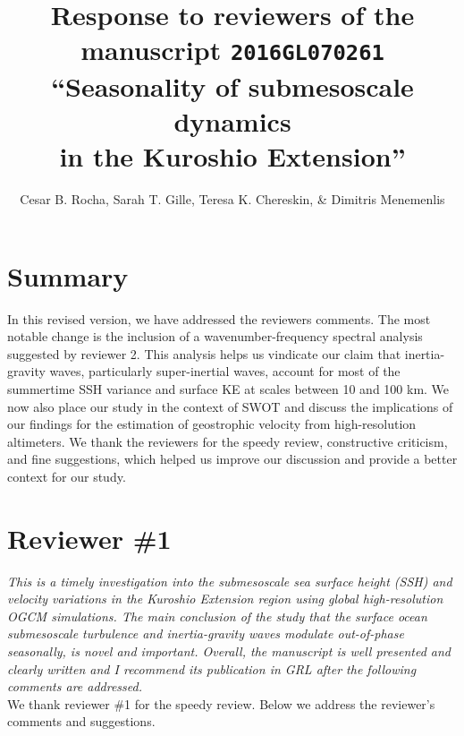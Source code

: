 \documentclass[11pt]{article}
\title{{\normalfont Response to reviewers of the manuscript \texttt{2016GL070261} }
       ``Seasonality of submesoscale
       dynamics \\in the Kuroshio Extension''}
\author{Cesar B. Rocha,
        Sarah T. Gille, Teresa K. Chereskin, \& Dimitris Menemenlis}
\date{}
\begin{document}
%

\maketitle

\section*{Summary}

In this revised version, we have addressed the reviewers
comments. The most notable change is the inclusion of a wavenumber-frequency
spectral analysis suggested by reviewer 2. This analysis helps us vindicate
our claim that inertia-gravity waves, particularly super-inertial waves,
account for most of the summertime SSH variance and surface KE at scales
between 10 and 100 km. We now also place our study in the context of SWOT and discuss
the implications of our findings for the estimation of geostrophic velocity from
high-resolution altimeters. We thank the reviewers  for the speedy review, constructive
criticism, and fine suggestions, which helped us improve our discussion and
provide a better context for our study.


\section{Reviewer \#1}

{\it This is a timely investigation into the submesoscale sea surface height (SSH) and
velocity variations in the Kuroshio Extension region using global high-resolution
OGCM simulations. The main conclusion of the study that the surface ocean submesoscale
turbulence and inertia-gravity waves modulate out-of-phase seasonally, is novel and
important. Overall, the manuscript is well presented and clearly written and I
recommend its publication in GRL after the following comments are addressed.}\\

We thank reviewer \#1 for the speedy review. Below we address the reviewer’s
comments and suggestions.
\end{document}
